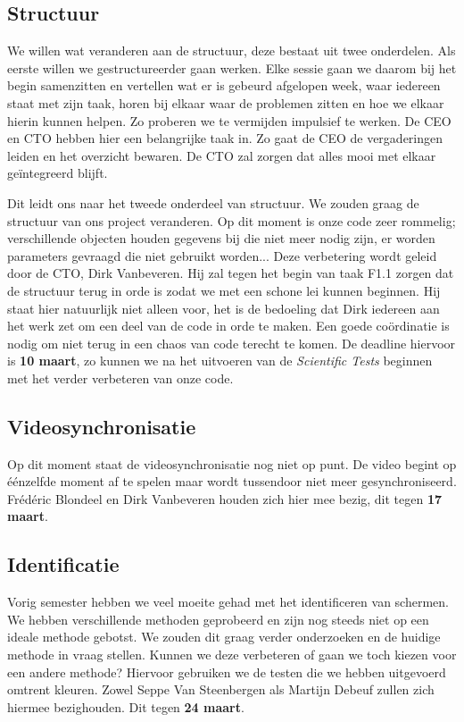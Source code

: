 \documentclass[a4paper,11pt]{article}
\begin{document}
\subsection{Structuur}
We willen wat veranderen aan de structuur, deze bestaat uit twee onderdelen. Als eerste willen we gestructureerder gaan werken. Elke sessie gaan we daarom bij het begin samenzitten en vertellen wat er is gebeurd afgelopen week, waar iedereen staat met zijn taak, horen bij elkaar waar de problemen zitten en hoe we elkaar hierin kunnen helpen. Zo proberen we te vermijden impulsief te werken. De CEO en CTO hebben hier een belangrijke taak in. Zo gaat de CEO de vergaderingen leiden en het overzicht bewaren. De CTO zal zorgen dat alles mooi met elkaar geïntegreerd blijft.

Dit leidt ons naar het tweede onderdeel van structuur. We zouden graag de structuur van ons project veranderen. Op dit moment is onze code zeer rommelig; verschillende objecten houden gegevens bij die niet meer nodig zijn, er worden parameters gevraagd die niet gebruikt worden... Deze verbetering wordt geleid door de CTO, Dirk Vanbeveren. Hij zal tegen het begin van taak F1.1 zorgen dat de structuur terug in orde is zodat we met een schone lei kunnen beginnen. Hij staat hier natuurlijk niet alleen voor, het is de bedoeling dat Dirk iedereen aan het werk zet om een deel van de code in orde te maken. Een goede coördinatie is nodig om niet terug in een chaos van code terecht te komen. De deadline hiervoor is {\bf 10 maart}, zo kunnen we na het uitvoeren van de {\it Scientific Tests} beginnen met het verder verbeteren van onze code.

\subsection{Videosynchronisatie}
Op dit moment staat de videosynchronisatie nog niet op punt. De video begint op éénzelfde moment af te spelen maar wordt tussendoor niet meer gesynchroniseerd.  Frédéric Blondeel en Dirk Vanbeveren houden zich hier mee bezig, dit tegen {\bf 17 maart}.

\subsection{Identificatie}
Vorig semester hebben we veel moeite gehad met het identificeren van schermen. We hebben verschillende methoden geprobeerd en zijn nog steeds niet op een ideale methode gebotst. We zouden dit graag verder onderzoeken en de huidige methode in vraag stellen. Kunnen we deze verbeteren of gaan we toch kiezen voor een andere methode? Hiervoor gebruiken we de testen die we hebben uitgevoerd omtrent kleuren. Zowel Seppe Van Steenbergen als Martijn Debeuf zullen zich hiermee bezighouden. Dit tegen {\bf 24 maart}.
\end{document}
